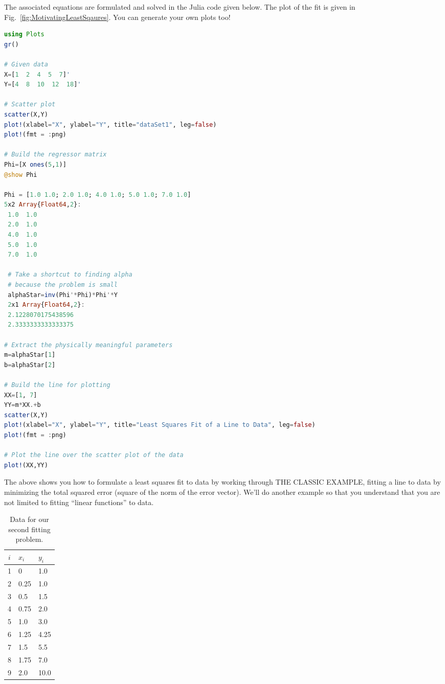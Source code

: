 The associated equations are formulated and solved in the Julia code given below. The plot of the fit is given in Fig.~\ref{fig:MotivatingLeastSqaures}. You can generate your own plots too!
  \vspace*{.2cm}
\UseRawInputEncoding
\begin{lstlisting}[language=Julia]
using Plots
gr()

# Given data
X=[1  2  4  5  7]'
Y=[4  8  10  12  18]'

# Scatter plot
scatter(X,Y)
plot!(xlabel="X", ylabel="Y", title="dataSet1", leg=false)
plot!(fmt = :png)

# Build the regressor matrix
Phi=[X ones(5,1)]
@show Phi

Phi = [1.0 1.0; 2.0 1.0; 4.0 1.0; 5.0 1.0; 7.0 1.0]
5x2 Array{Float64,2}:
 1.0  1.0
 2.0  1.0
 4.0  1.0
 5.0  1.0
 7.0  1.0
 
 # Take a shortcut to finding alpha 
 # because the problem is small
 alphaStar=inv(Phi'*Phi)*Phi'*Y
 2x1 Array{Float64,2}:
 2.1228070175438596
 2.3333333333333375
 
# Extract the physically meaningful parameters 
m=alphaStar[1]
b=alphaStar[2]

# Build the line for plotting
XX=[1, 7]
YY=m*XX.+b
scatter(X,Y)
plot!(xlabel="X", ylabel="Y", title="Least Squares Fit of a Line to Data", leg=false)
plot!(fmt = :png)

# Plot the line over the scatter plot of the data
plot!(XX,YY) 
\end{lstlisting}
  \vspace*{.2cm}

The above shows you how to formulate a least squares fit to data by working through THE CLASSIC EXAMPLE, fitting a line to data by minimizing the total squared error (square of the norm of the error vector). We'll do another example so that you understand that you are not limited to fitting ``linear functions'' to data. 

\begin{table}[!hb]
\caption[]{Data for our second fitting problem.}
\label{tab:QuadraticData}
\begin{center}
\begin{tabular}{||c|l|l||}
\hline
$ i$ & $x_i$ & $y_i$\\
\hline
1 &0  &   1.0 \\
 2& 0.25    &  1.0 \\
3& 0.5   & 1.5 \\
4& 0.75  &  2.0 \\
5 & 1.0   & 3.0 \\
6 & 1.25   & 4.25 \\
7 & 1.5   & 5.5 \\
8 & 1.75   & 7.0 \\
9 & 2.0   & 10.0 \\
\hline
\end{tabular}
\end{center}
\end{table}

